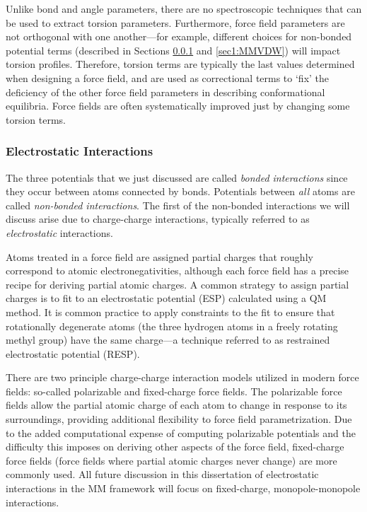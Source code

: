 Unlike bond and angle parameters, there are no spectroscopic techniques that can
be used to extract torsion parameters. Furthermore, force field parameters are
not orthogonal with one another---for example, different choices for non-bonded
potential terms (described in Sections \ref{sec1:MMEEL} and \ref{sec1:MMVDW})
will impact torsion profiles. Therefore, torsion terms are typically the last
values determined when designing a force field, and are used as correctional
terms to `fix' the deficiency of the other force field parameters in describing
conformational equilibria. Force fields are often systematically improved just
by changing some torsion terms. \cite{Hornak_Proteins_2006_v65_p712,
Perez_BiophysJ_2007_v92_p3817, Lindorff-Larsen_Proteins_2010_v78_p1950}

\subsubsection{Electrostatic Interactions}
\label{sec1:MMEEL}

The three potentials that we just discussed are called \emph{bonded
interactions} since they occur between atoms connected by bonds. Potentials
between \emph{all} atoms are called \emph{non-bonded interactions}. The first of
the non-bonded interactions we will discuss arise due to charge-charge
interactions, typically referred to as \emph{electrostatic} interactions.

Atoms treated in a force field are assigned partial charges that roughly
correspond to atomic electronegativities, although each force field has a
precise recipe for deriving partial atomic charges. A common strategy to assign
partial charges is to fit to an electrostatic potential (ESP) calculated using a
QM method. It is common practice to apply constraints to the fit to ensure that
rotationally degenerate atoms (\eg the three hydrogen atoms in a freely rotating
methyl group) have the same charge---a technique referred to as restrained
electrostatic potential (RESP). \cite{Bayly_JPhysChem_1993_v97_p10269,
Cornell_JAmChemSoc_1993_v115_p9620, Cieplak_JComputChem_1995_v16_p1357}

There are two principle charge-charge interaction models utilized in modern
force fields: so-called polarizable and fixed-charge force fields. The
polarizable force fields allow the partial atomic charge of each atom to change
in response to its surroundings, providing additional flexibility to force field
parametrization. Due to the added computational expense of computing polarizable
potentials and the difficulty this imposes on deriving other aspects of the
force field, fixed-charge force fields (\ie force fields where partial atomic
charges never change) are more commonly used. All future discussion in this
dissertation of electrostatic interactions in the MM framework will focus on
fixed-charge, monopole-monopole interactions.

